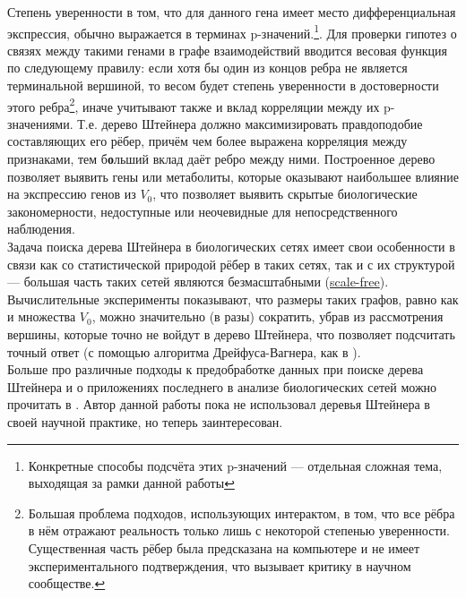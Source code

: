 \documentclass[11pt,a4paper]{report}
\theoremstyle{definition}
\theoremstyle{definition}
\theoremstyle{definition}
\begin{document}
	\noindent Степень уверенности в том, что для данного гена имеет место дифференциальная экспрессия, обычно выражается в терминах p-значений.\footnote{Конкретные способы подсчёта этих p-значений — отдельная сложная тема, выходящая за рамки данной работы}. Для проверки гипотез о связях между такими генами в графе взаимодействий вводится весовая функция по следующему правилу: если хотя бы один из концов ребра не является терминальной вершиной, то весом будет степень уверенности в достоверности этого ребра\footnote{Большая проблема подходов, использующих интерактом, в том, что все рёбра в нём отражают реальность только лишь с некоторой степенью уверенности. Существенная часть рёбер была предсказана на компьютере и не имеет экспериментального подтверждения, что вызывает критику в научном сообществе.}, иначе учитывают также и вклад корреляции между их p-значениями. Т.е. дерево Штейнера должно максимизировать правдоподобие составляющих его рёбер, причём чем более выражена корреляция между признаками, тем б\textbf{о}льший вклад даёт ребро между ними. Построенное дерево позволяет выявить гены или метаболиты, которые оказывают наибольшее влияние на экспрессию генов из $V_0$, что позволяет выявить скрытые биологические закономерности, недоступные или неочевидные для непосредственного наблюдения.\\
	
	\noindent Задача поиска дерева Штейнера в биологических сетях имеет свои особенности в связи как со статистической природой рёбер в таких сетях, так и с их структурой — большая часть таких сетей являются безмасштабными  (\href{https://en.wikipedia.org/wiki/Scale-free_network}{scale-free}). Вычислительные эксперименты \cite{UniTubingen} показывают, что размеры таких графов, равно как и множества $V_0$, можно значительно (в разы) сократить, убрав из рассмотрения вершины, которые точно не войдут в дерево Штейнера, что позволяет подсчитать точный ответ (с помощью алгоритма Дрейфуса-Вагнера, как в \cite{UniTubingen}).\\
	
	\noindent Больше про различные подходы к предобработке данных при поиске дерева Штейнера и о приложениях последнего в анализе биологических сетей можно прочитать в \cite{UniTubingen}. Автор данной работы пока не использовал деревья Штейнера в своей научной практике, но теперь заинтересован.
\end{document}
